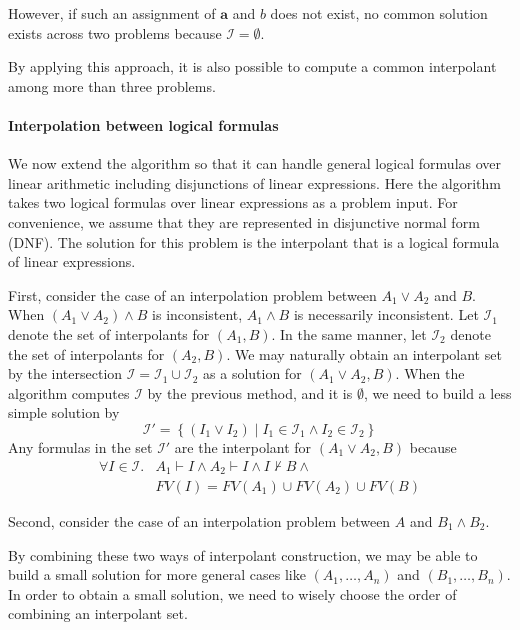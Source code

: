 \documentclass[master,final,12pt]{iscs-thesis}
\begin{document}
However, if such an assignment of $\mathbf{a}$ and $b$ does not exist,
no common solution exists across two problems because $\mathcal{I} =
\emptyset$.

By applying this approach, it is also possible to compute a common
interpolant among more than three problems.


\paragraph{Interpolation between logical formulas}
We now extend the algorithm so that it can handle general logical
formulas over linear arithmetic including disjunctions of linear
expressions.  Here the algorithm takes two logical formulas over
linear expressions as a problem input.  For convenience, we assume
that they are represented in disjunctive normal form (DNF).  The
solution for this problem is the interpolant that is a logical formula
of linear expressions.

First, consider the case of an interpolation problem between $A_1 \vee
A_2$ and $B$.  When $(A_1 \vee A_2) \wedge B$ is inconsistent, $A_1
\wedge B$ is necessarily inconsistent.  Let $\mathcal{I}_1$ denote the
set of interpolants for $(A_1, B)$.  In the same manner, let
$\mathcal{I}_2$ denote the set of interpolants for $(A_2, B)$.  We may
naturally obtain an interpolant set by the intersection $\mathcal{I} =
\mathcal{I}_1 \cup \mathcal{I}_2$ as a solution for $(A_1 \vee A_2,
B)$.  When the algorithm computes $\mathcal{I}$ by the previous
method, and it is $\emptyset$, we need to build a less simple solution
by
\[ \mathcal{I}' = \left\lbrace \left( I_1 \vee I_2 \right) \mid
I_1 \in \mathcal{I}_1 \wedge I_2 \in \mathcal{I}_2 \right\rbrace \]
Any formulas in the set $\mathcal{I}'$ are the interpolant for $(A_1
\vee A_2, B)$ because
\begin{align*}
\forall I \in \mathcal{I}. & A_1 \vdash I \wedge A_2 \vdash I \wedge I \nvdash B \wedge \\
& FV(I) = FV(A_1) \cup FV(A_2) \cup FV(B)
\end{align*}

Second, consider the case of an interpolation problem between $A$ and
$B_1 \wedge B_2$.

By combining these two ways of interpolant construction, we may be
able to build a small solution for more general cases like $(A_1,
\ldots, A_n)$ and $(B_1, \ldots, B_n)$.  In order to obtain a small
solution, we need to wisely choose the order of combining an
interpolant set.
\end{document}
